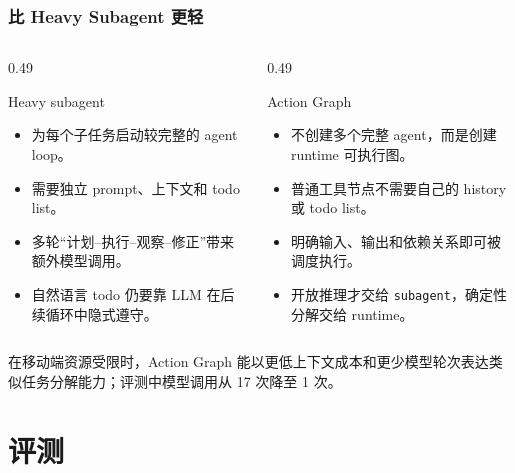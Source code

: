 \documentclass[aspectratio=169]{ctexbeamer}
\newcommand{\code}[1]{\texttt{#1}}
\begin{document}
\begin{frame}
  \frametitle{比 Heavy Subagent 更轻}
  \begin{columns}[T,onlytextwidth]
    \begin{column}{0.49\textwidth}
      \begin{block}{Heavy subagent}
        \scriptsize
        \begin{itemize}
          \item 为每个子任务启动较完整的 agent loop。
          \item 需要独立 prompt、上下文和 todo list。
          \item 多轮“计划--执行--观察--修正”带来额外模型调用。
          \item 自然语言 todo 仍要靠 LLM 在后续循环中隐式遵守。
        \end{itemize}
      \end{block}
    \end{column}
    \begin{column}{0.49\textwidth}
      \begin{block}{Action Graph}
        \scriptsize
        \begin{itemize}
          \item 不创建多个完整 agent，而是创建 runtime 可执行图。
          \item 普通工具节点不需要自己的 history 或 todo list。
          \item 明确输入、输出和依赖关系即可被调度执行。
          \item 开放推理才交给 \code{subagent}，确定性分解交给 runtime。
        \end{itemize}
      \end{block}
    \end{column}
  \end{columns}

  \vspace{0.35em}
  \footnotesize
  在移动端资源受限时，Action Graph 能以更低上下文成本和更少模型轮次表达类似任务分解能力；评测中模型调用从 17 次降至 1 次。
\end{frame}

\section{评测}
\end{document}

